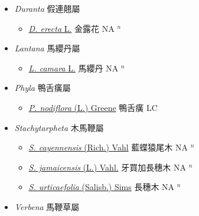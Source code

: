 
  \begin{itemize}
 \item[] \textit{Duranta} 假連翹屬
                    
  \begin{itemize}
        \item[] \href{http://www.theplantlist.org/tpl1.1/search?q=Duranta+erecta}{\textit{D. erecta} L.}   金露花 NA $^n$
  \end{itemize}
 \item[] \textit{Lantana} 馬纓丹屬
                    
  \begin{itemize}
        \item[] \href{http://www.theplantlist.org/tpl1.1/search?q=Lantana+camara}{\textit{L. camara} L.}   馬纓丹 NA $^n$
  \end{itemize}
 \item[] \textit{Phyla} 鴨舌癀屬
                    
  \begin{itemize}
        \item[] \href{http://www.theplantlist.org/tpl1.1/search?q=Phyla+nodiflora}{\textit{P. nodiflora} (L.) Greene}   鴨舌癀 LC
  \end{itemize}
 \item[] \textit{Stachytarpheta} 木馬鞭屬
                    
  \begin{itemize}
        \item[] \href{http://www.theplantlist.org/tpl1.1/search?q=Stachytarpheta+cayennensis}{\textit{S. cayennensis} (Rich.) Vahl}   藍蝶猿尾木 NA $^n$
        \item[] \href{http://www.theplantlist.org/tpl1.1/search?q=Stachytarpheta+jamaicensis}{\textit{S. jamaicensis} (L.) Vahl.}   牙買加長穗木 NA $^n$
        \item[] \href{http://www.theplantlist.org/tpl1.1/search?q=Stachytarpheta+urticaefolia}{\textit{S. urticaefolia} (Salisb.) Sims}   長穗木 NA $^n$
  \end{itemize}
 \item[] \textit{Verbena} 馬鞭草屬
                    

\end{itemize}
